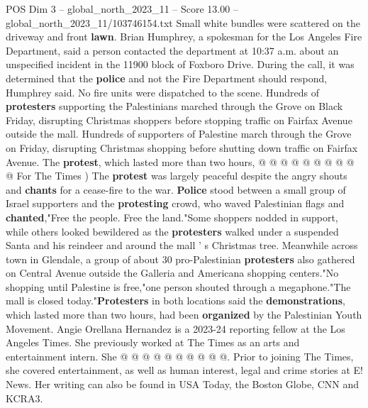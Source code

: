 \begin{textsample}{POS Dim 3 – global\_north\_2023\_11 – Score 13.00 – global\_north\_2023\_11/103746154.txt}
Small white bundles were scattered on the driveway and front \textbf{lawn}.
Brian Humphrey, a spokesman for the Los Angeles Fire Department, said a person contacted the department at 10:37 a.m. about an unspecified incident in the 11900 block of Foxboro Drive.
During the call, it was determined that the \textbf{police} and not the Fire Department should respond, Humphrey said.
No fire units were dispatched to the scene.
Hundreds of \textbf{protesters} supporting the Palestinians marched through the Grove on Black Friday, disrupting Christmas shoppers before stopping traffic on Fairfax Avenue outside the mall.
Hundreds of supporters of Palestine march through the Grove on Friday, disrupting Christmas shopping before shutting down traffic on Fairfax Avenue.
The \textbf{protest}, which lasted more than two hours, @ @ @ @ @ @ @ @ @ @ For The Times ) The \textbf{protest} was largely peaceful despite the angry shouts and \textbf{chants} for a cease-fire to the war. \textbf{Police} stood between a small group of Israel supporters and the \textbf{protesting} crowd, who waved Palestinian flags and \textbf{chanted},"Free the people.
Free the land."Some shoppers nodded in support, while others looked bewildered as the \textbf{protesters} walked under a suspended Santa and his reindeer and around the mall ' s Christmas tree.
Meanwhile across town in Glendale, a group of about 30 pro-Palestinian \textbf{protesters} also gathered on Central Avenue outside the Galleria and Americana shopping centers."No shopping until Palestine is free,"one person shouted through a megaphone."The mall is closed today."\textbf{Protesters} in both locations said the \textbf{demonstrations}, which lasted more than two hours, had been \textbf{organized} by the Palestinian Youth Movement.
Angie Orellana Hernandez is a 2023-24 reporting fellow at the Los Angeles Times.
She previously worked at The Times as an arts and entertainment intern.
She @ @ @ @ @ @ @ @ @ @.
Prior to joining The Times, she covered entertainment, as well as human interest, legal and crime stories at E!
News.
Her writing can also be found in USA Today, the Boston Globe, CNN and KCRA3.

\end{textsample}
